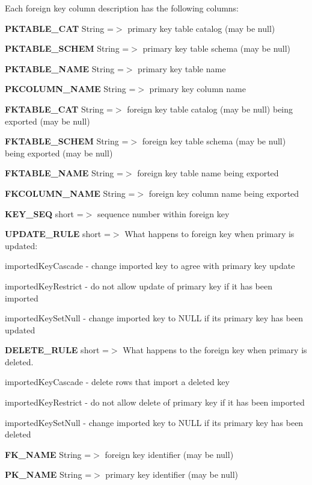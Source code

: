 Each foreign key column description has the following columns\+: 
\begin{DoxyEnumerate}
\item {\bfseries P\+K\+T\+A\+B\+L\+E\+\_\+\+C\+AT} String =$>$ primary key table catalog (may be null) 
\item {\bfseries P\+K\+T\+A\+B\+L\+E\+\_\+\+S\+C\+H\+EM} String =$>$ primary key table schema (may be null) 
\item {\bfseries P\+K\+T\+A\+B\+L\+E\+\_\+\+N\+A\+ME} String =$>$ primary key table name 
\item {\bfseries P\+K\+C\+O\+L\+U\+M\+N\+\_\+\+N\+A\+ME} String =$>$ primary key column name 
\item {\bfseries F\+K\+T\+A\+B\+L\+E\+\_\+\+C\+AT} String =$>$ foreign key table catalog (may be null) being exported (may be null) 
\item {\bfseries F\+K\+T\+A\+B\+L\+E\+\_\+\+S\+C\+H\+EM} String =$>$ foreign key table schema (may be null) being exported (may be null) 
\item {\bfseries F\+K\+T\+A\+B\+L\+E\+\_\+\+N\+A\+ME} String =$>$ foreign key table name being exported 
\item {\bfseries F\+K\+C\+O\+L\+U\+M\+N\+\_\+\+N\+A\+ME} String =$>$ foreign key column name being exported 
\item {\bfseries K\+E\+Y\+\_\+\+S\+EQ} short =$>$ sequence number within foreign key 
\item {\bfseries U\+P\+D\+A\+T\+E\+\_\+\+R\+U\+LE} short =$>$ What happens to foreign key when primary is updated\+: 
\begin{DoxyItemize}
\item imported\+Key\+Cascade -\/ change imported key to agree with primary key update 
\item imported\+Key\+Restrict -\/ do not allow update of primary key if it has been imported 
\item imported\+Key\+Set\+Null -\/ change imported key to N\+U\+LL if its primary key has been updated 
\end{DoxyItemize}
\item {\bfseries D\+E\+L\+E\+T\+E\+\_\+\+R\+U\+LE} short =$>$ What happens to the foreign key when primary is deleted. 
\begin{DoxyItemize}
\item imported\+Key\+Cascade -\/ delete rows that import a deleted key 
\item imported\+Key\+Restrict -\/ do not allow delete of primary key if it has been imported 
\item imported\+Key\+Set\+Null -\/ change imported key to N\+U\+LL if its primary key has been deleted 
\end{DoxyItemize}
\item {\bfseries F\+K\+\_\+\+N\+A\+ME} String =$>$ foreign key identifier (may be null) 
\item {\bfseries P\+K\+\_\+\+N\+A\+ME} String =$>$ primary key identifier (may be null) 
\end{DoxyEnumerate}


